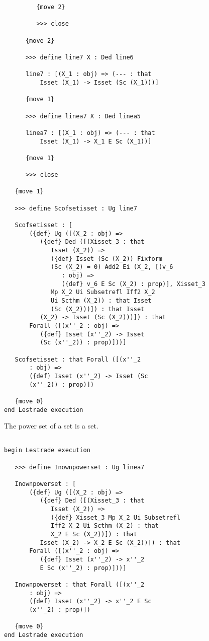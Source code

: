 \documentclass[12pt]{article}
\begin{document}
\begin{verbatim}
         {move 2}

         >>> close

      {move 2}

      >>> define line7 X : Ded line6

      line7 : [(X_1 : obj) => (--- : that 
          Isset (X_1) -> Isset (Sc (X_1)))]

      {move 1}

      >>> define linea7 X : Ded linea5

      linea7 : [(X_1 : obj) => (--- : that 
          Isset (X_1) -> X_1 E Sc (X_1))]

      {move 1}

      >>> close

   {move 1}

   >>> define Scofsetisset : Ug line7

   Scofsetisset : [
       ({def} Ug ([(X_2 : obj) => 
          ({def} Ded ([(Xisset_3 : that 
             Isset (X_2)) => 
             ({def} Isset (Sc (X_2)) Fixform 
             (Sc (X_2) = 0) Add2 Ei (X_2, [(v_6 
                : obj) => 
                ({def} v_6 E Sc (X_2) : prop)], Xisset_3 
             Mp X_2 Ui Subsetrefl Iff2 X_2 
             Ui Scthm (X_2)) : that Isset 
             (Sc (X_2)))]) : that Isset 
          (X_2) -> Isset (Sc (X_2)))]) : that 
       Forall ([(x''_2 : obj) => 
          ({def} Isset (x''_2) -> Isset 
          (Sc (x''_2)) : prop)]))]

   Scofsetisset : that Forall ([(x''_2 
       : obj) => 
       ({def} Isset (x''_2) -> Isset (Sc 
       (x''_2)) : prop)])

   {move 0}
end Lestrade execution
\end{verbatim}

The power set of a set is a set.

\begin{verbatim}

begin Lestrade execution

   >>> define Inownpowerset : Ug linea7

   Inownpowerset : [
       ({def} Ug ([(X_2 : obj) => 
          ({def} Ded ([(Xisset_3 : that 
             Isset (X_2)) => 
             ({def} Xisset_3 Mp X_2 Ui Subsetrefl 
             Iff2 X_2 Ui Scthm (X_2) : that 
             X_2 E Sc (X_2))]) : that 
          Isset (X_2) -> X_2 E Sc (X_2))]) : that 
       Forall ([(x''_2 : obj) => 
          ({def} Isset (x''_2) -> x''_2 
          E Sc (x''_2) : prop)]))]

   Inownpowerset : that Forall ([(x''_2 
       : obj) => 
       ({def} Isset (x''_2) -> x''_2 E Sc 
       (x''_2) : prop)])

   {move 0}
end Lestrade execution
\end{verbatim}
\end{document}
